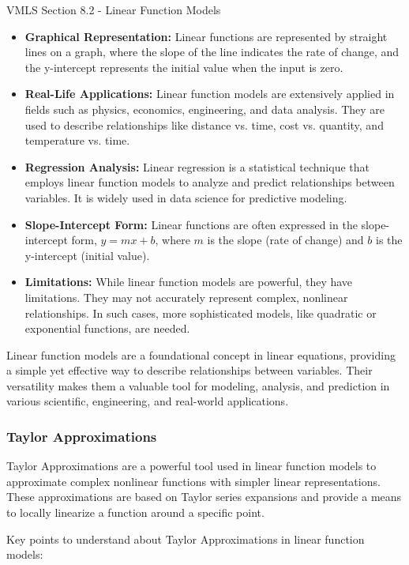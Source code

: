 \begin{notes}{VMLS Section 8.2 - Linear Function Models}
    \begin{itemize}
        \item \textbf{Graphical Representation:} Linear functions are represented by straight lines on a graph, where the slope of the line indicates the rate of change, and the y-intercept represents 
        the initial value when the input is zero.
        \item \textbf{Real-Life Applications:} Linear function models are extensively applied in fields such as physics, economics, engineering, and data analysis. They are used to describe relationships 
        like distance vs. time, cost vs. quantity, and temperature vs. time.
        \item \textbf{Regression Analysis:} Linear regression is a statistical technique that employs linear function models to analyze and predict relationships between variables. It is widely used in 
        data science for predictive modeling.
        \item \textbf{Slope-Intercept Form:} Linear functions are often expressed in the slope-intercept form, $y = mx + b$, where $m$ is the slope (rate of change) and $b$ is the y-intercept (initial 
        value).
        \item \textbf{Limitations:} While linear function models are powerful, they have limitations. They may not accurately represent complex, nonlinear relationships. In such cases, more sophisticated 
        models, like quadratic or exponential functions, are needed.
    \end{itemize}
    
    Linear function models are a foundational concept in linear equations, providing a simple yet effective way to describe relationships between variables. Their versatility makes them a valuable tool 
    for modeling, analysis, and prediction in various scientific, engineering, and real-world applications.

    \subsubsection*{Taylor Approximations}

    Taylor Approximations are a powerful tool used in linear function models to approximate complex nonlinear functions with simpler linear representations. These approximations are based on Taylor 
    series expansions and provide a means to locally linearize a function around a specific point.

    Key points to understand about Taylor Approximations in linear function models:


\end{notes}
